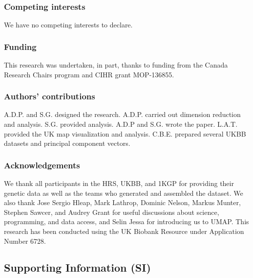 \documentclass[12pt]{pnas-new}
\newcommand{\beginsupplement}{%
        \setcounter{table}{0}
        \renewcommand{\thetable}{S\arabic{table}}%
        \setcounter{figure}{0}
        \renewcommand{\thefigure}{S\arabic{figure}}%
     }
\begin{document}
\subsubsection*{Competing interests}
We have no competing interests to declare.

\subsubsection*{Funding}
This research was undertaken, in part, thanks to funding from the Canada Research Chairs program and CIHR grant MOP-136855.

\subsubsection*{Authors' contributions}
A.D.P. and S.G. designed the research. A.D.P. carried out dimension reduction and analysis. S.G. provided analysis. A.D.P and S.G. wrote the paper. L.A.T. provided the UK map visualization and analysis. C.B.E. prepared several UKBB datasets and principal component vectors.

\subsubsection*{Acknowledgements}
We thank all participants in the HRS, UKBB, and 1KGP for providing their genetic data as well as the teams who generated and assembled the dataset. We also thank Jose Sergio Hleap, Mark Lathrop, Dominic Nelson, Markus Munter, Stephen Sawcer, and Audrey Grant for useful discussions about science, programming, and data access, and Selin Jessa for introducing us to UMAP. This research has been conducted using the UK Biobank Resource under Application Number 6728.



\newpage

\beginsupplement
\subsection*{Supporting Information (SI)}
\end{document}
